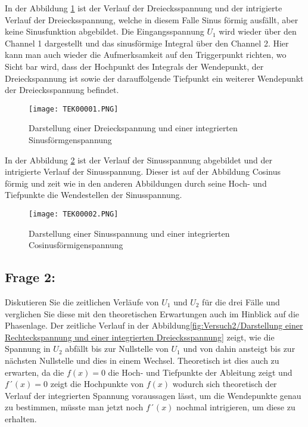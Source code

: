 \newpage
In der Abbildung \ref{fig:Versuch2/Darstellung einer Dreieckspannung und einer integrierten Sinusförmigenspannung} ist der Verlauf der Dreiecksspannung und der intrigierte Verlauf der Dreiecksspannung, welche in diesem Falle Sinus förmig ausfällt, aber keine Sinusfunktion abgebildet. Die Eingangsspannung $U_1$ wird wieder über den Channel 1 dargestellt und das sinusförmige Integral über den Channel 2. Hier kann man auch wieder die Aufmerksamkeit auf den Triggerpunkt richten, wo Sicht bar wird, dass der Hochpunkt des Integrals der Wendepunkt, der Dreieckspannung ist sowie der darauffolgende Tiefpunkt ein weiterer Wendepunkt der Dreiecksspannung befindet.    
\begin{figure}[H]
    \centering
    \texttt{[image: TEK00001.PNG]}
    \caption{Darstellung einer Dreieckspannung und einer integrierten Sinusförmgenspannung}
    \label{fig:Versuch2/Darstellung einer Dreieckspannung und einer integrierten Sinusförmigenspannung}
\end{figure}
In der Abbildung \ref{fig:Versuch2/Darstellung einer Sinusspannung und einer integrierten Cosinusförmigenspannung} ist der Verlauf der Sinusspannung abgebildet und der intrigierte Verlauf der Sinusspannung. Dieser ist auf der Abbildung Cosinus förmig und zeit wie in den anderen Abbildungen durch seine Hoch- und Tiefpunkte die Wendestellen der Sinusspannung.      
\begin{figure}[H]
    \centering
    \texttt{[image: TEK00002.PNG]}
    \caption{Darstellung einer Sinusspannung und einer integrierten Cosinusförmigenspannung}
    \label{fig:Versuch2/Darstellung einer Sinusspannung und einer integrierten Cosinusförmigenspannung}
\end{figure}
\subsection{Frage 2:} Diskutieren Sie die zeitlichen Verläufe von $U_1$ und $U_2$ für die drei Fälle und verglichen Sie diese mit den theoretischen Erwartungen auch im Hinblick auf die Phasenlage.
Der zeitliche Verlauf in der Abbildung\ref{fig:Versuch2/Darstellung einer Rechteckspannung und einer integrierten Dreiecksspannung} zeigt, wie die Spannung in $U_2$ abfällt bis zur Nullstelle von $U_1$ und  von dahin ansteigt bis zur nächsten Nullstelle und dies in einem Wechsel. Theoretisch ist dies auch zu erwarten, da die $f(x)=0$ die Hoch- und Tiefpunkte der Ableitung zeigt und $f´(x)=0$ zeigt die Hochpunkte von $f(x)$ wodurch sich theoretisch der Verlauf der integrierten Spannung voraussagen lässt, um die Wendepunkte genau zu bestimmen, müsste man jetzt noch $f´(x)$ nochmal intrigieren, um diese zu erhalten. 





